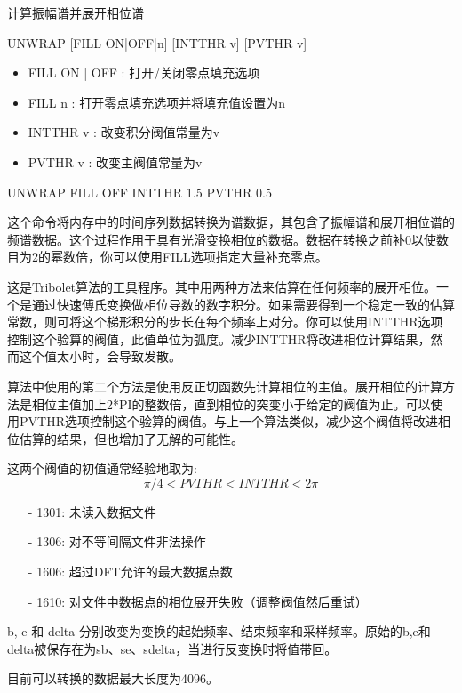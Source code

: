 \label{cmd:unwrap}

计算振幅谱并展开相位谱

\begin{SACSTX}
UNWRAP [FILL ON|OFF|n] [INTTHR v] [PVTHR v]
\end{SACSTX}

\begin{itemize}
\item FILL ON | OFF : 打开/关闭零点填充选项 
\item FILL n : 打开零点填充选项并将填充值设置为n 
\item INTTHR v : 改变积分阀值常量为v 
\item PVTHR v : 改变主阀值常量为v 
\end{itemize}

\begin{SACDFT}
UNWRAP FILL OFF INTTHR 1.5 PVTHR 0.5
\end{SACDFT}

这个命令将内存中的时间序列数据转换为谱数据，其包含了振幅谱和展开相位谱的频谱数据。这个过程作用于具有光滑变换相位的数据。数据在转换之前补0以使数目为2的幂数倍，你可以使用FILL选项指定大量补充零点。

这是Tribolet算法的工具程序。其中用两种方法来估算在任何频率的展开相位。一个是通过快速傅氏变换做相位导数的数字积分。如果需要得到一个稳定一致的估算常数，则可将这个梯形积分的步长在每个频率上对分。你可以使用INTTHR选项控制这个验算的阀值，此值单位为弧度。减少INTTHR将改进相位计算结果，然而这个值太小时，会导致发散。

算法中使用的第二个方法是使用反正切函数先计算相位的主值。展开相位的计算方法是相位主值加上2*PI的整数倍，直到相位的突变小于给定的阀值为止。可以使用PVTHR选项控制这个验算的阀值。与上一个算法类似，减少这个阀值将改进相位估算的结果，但也增加了无解的可能性。

这两个阀值的初值通常经验地取为:
\[ \pi/4 < PVTHR < INTTHR < 2\pi \]

\begin{itemize}
\item[-]1301: 未读入数据文件
\item[-]1306: 对不等间隔文件非法操作
\item[-]1606: 超过DFT允许的最大数据点数
\end{itemize}

\begin{itemize}
\item[-]1610: 对文件中数据点的相位展开失败（调整阀值然后重试）
\end{itemize}

b, e 和 delta 分别改变为变换的起始频率、结束频率和采样频率。原始的b,e和delta被保存在为sb、se、sdelta，当进行反变换时将值带回。

目前可以转换的数据最大长度为4096。
